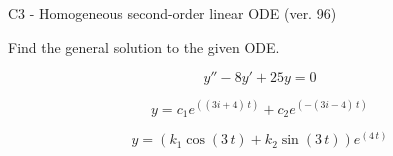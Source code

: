 \begin{exercise}
  \begin{exerciseTitle}C3 - Homogeneous second-order linear ODE (ver. 96)\end{exerciseTitle}
  \begin{exerciseStatement}
    
Find the general solution to the given ODE.

    
\[y''-8y'+25y = 0\]

  \end{exerciseStatement}
  \begin{exerciseAnswer}
    
\[y= c_{1} e^{\left(\left(3 i + 4\right) \, t\right)} + c_{2} e^{\left(-\left(3 i - 4\right) \, t\right)}\]

    
\[y= {\left(k_{1} \cos\left(3 \, t\right) + k_{2} \sin\left(3 \, t\right)\right)} e^{\left(4 \, t\right)}\]

  \end{exerciseAnswer}
\end{exercise}